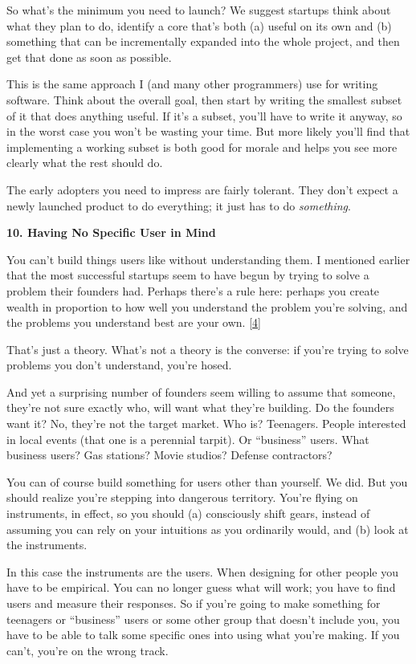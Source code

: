 So what's the minimum you need to launch? We suggest startups think
about what they plan to do, identify a core that's both (a) useful on
its own and (b) something that can be incrementally expanded into the
whole project, and then get that done as soon as possible.

This is the same approach I (and many other programmers) use for writing
software. Think about the overall goal, then start by writing the
smallest subset of it that does anything useful. If it's a subset,
you'll have to write it anyway, so in the worst case you won't be
wasting your time. But more likely you'll find that implementing a
working subset is both good for morale and helps you see more clearly
what the rest should do.

The early adopters you need to impress are fairly tolerant. They don't
expect a newly launched product to do everything; it just has to do
\emph{something}.

\textbf{10. Having No Specific User in Mind}

You can't build things users like without understanding them. I
mentioned earlier that the most successful startups seem to have begun
by trying to solve a problem their founders had. Perhaps there's a rule
here: perhaps you create wealth in proportion to how well you understand
the problem you're solving, and the problems you understand best are
your own. {[}\hyperref[f4n]{4}{]}

That's just a theory. What's not a theory is the converse: if you're
trying to solve problems you don't understand, you're hosed.

And yet a surprising number of founders seem willing to assume that
someone, they're not sure exactly who, will want what they're building.
Do the founders want it? No, they're not the target market. Who is?
Teenagers. People interested in local events (that one is a perennial
tarpit). Or ``business'' users. What business users? Gas stations? Movie
studios? Defense contractors?

You can of course build something for users other than yourself. We did.
But you should realize you're stepping into dangerous territory. You're
flying on instruments, in effect, so you should (a) consciously shift
gears, instead of assuming you can rely on your intuitions as you
ordinarily would, and (b) look at the instruments.

In this case the instruments are the users. When designing for other
people you have to be empirical. You can no longer guess what will work;
you have to find users and measure their responses. So if you're going
to make something for teenagers or ``business'' users or some other
group that doesn't include you, you have to be able to talk some
specific ones into using what you're making. If you can't, you're on the
wrong track.

